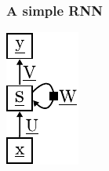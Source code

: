 \begin{frame}\frametitle{A simple RNN}


		
	\begin{minipage}{\textwidth}
		\begin{minipage}{0.21\textwidth}
			{\includegraphics[width=\textwidth]{img/rnn.pdf}}
		\end{minipage}	
		\hspace{0.6cm}
		\begin{minipage}{0.6\textwidth}
		

\end{minipage}
\end{minipage}
\end{frame}
